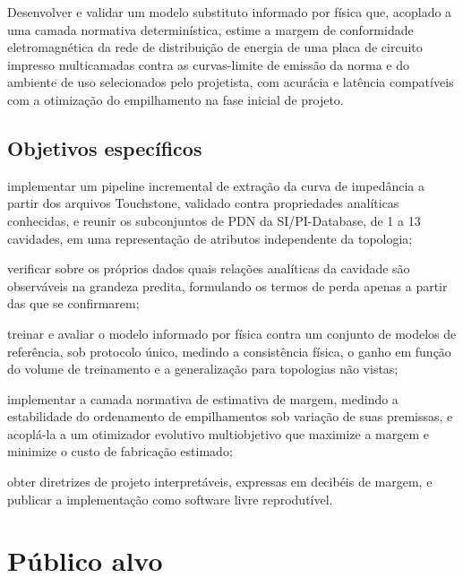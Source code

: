 Desenvolver e validar um modelo substituto informado por física que, acoplado a uma
camada normativa determinística, estime a margem de conformidade eletromagnética da
rede de distribuição de energia de uma placa de circuito impresso multicamadas
contra as curvas-limite de emissão da norma e do ambiente de uso selecionados pelo
projetista, com acurácia e latência compatíveis com a otimização do empilhamento na
fase inicial de projeto.

\subsection{Objetivos específicos}

\begin{alineas}
\item implementar um pipeline incremental de extração da curva de impedância a
partir dos arquivos Touchstone, validado contra propriedades analíticas conhecidas,
e reunir os subconjuntos de PDN da SI/PI-Database, de 1 a 13 cavidades, em uma
representação de atributos independente da topologia;

\item verificar sobre os próprios dados quais relações analíticas da cavidade são
observáveis na grandeza predita, formulando os termos de perda apenas a partir das
que se confirmarem;

\item treinar e avaliar o modelo informado por física contra um conjunto de modelos
de referência, sob protocolo único, medindo a consistência física, o ganho em função
do volume de treinamento e a generalização para topologias não vistas;

\item implementar a camada normativa de estimativa de margem, medindo a estabilidade
do ordenamento de empilhamentos sob variação de suas premissas, e acoplá-la a um
otimizador evolutivo multiobjetivo que maximize a margem e minimize o custo de
fabricação estimado;

\item obter diretrizes de projeto interpretáveis, expressas em decibéis de margem, e
publicar a implementação como software livre reprodutível.
\end{alineas}

\section{Público alvo}
\label{sec:publico}

